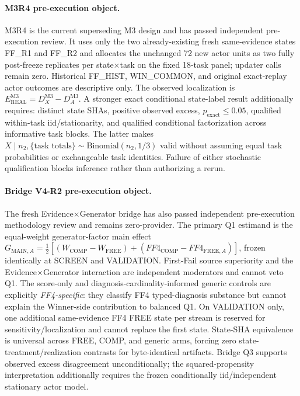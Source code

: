 \paragraph{M3R4 pre-execution object.}
M3R4 is the current superseding M3 design and has passed independent pre-execution review. It uses only the two already-existing fresh same-evidence states FF\_R1 and FF\_R2 and allocates the unchanged 72 new actor units as two fully post-freeze replicates per state$\times$task on the fixed 18-task panel; updater calls remain zero. Historical FF\_HIST, WIN\_COMMON, and original exact-replay actor outcomes are descriptive only. The observed localization is $E_{\mathrm{REAL}}^{\mathrm{M3}}=D_X^{\mathrm{M3}}-D_A^{\mathrm{M3}}$. A stronger exact conditional state-label result additionally requires: distinct state SHAs, positive observed excess, $p_{\mathrm{exact}}\leq0.05$, qualified within-task iid/stationarity, and qualified conditional factorization across informative task blocks. The latter makes $X\mid n_2,\{\text{task totals}\}\sim\mathrm{Binomial}(n_2,1/3)$ valid without assuming equal task probabilities or exchangeable task identities. Failure of either stochastic qualification blocks inference rather than authorizing a rerun.

\paragraph{Bridge V4-R2 pre-execution object.}
The fresh Evidence$\times$Generator bridge has also passed independent pre-execution methodology review and remains zero-provider. The primary Q1 estimand is the equal-weight generator-factor main effect $G_{\mathrm{MAIN},A}=\frac12[(W_{\mathrm{COMP}}-W_{\mathrm{FREE}})+(FF4_{\mathrm{COMP}}-FF4_{\mathrm{FREE},A})]$, frozen identically at SCREEN and VALIDATION. First-Fail source superiority and the Evidence$\times$Generator interaction are independent moderators and cannot veto Q1. The score-only and diagnosis-cardinality-informed generic controls are explicitly \emph{FF4-specific}: they classify FF4 typed-diagnosis substance but cannot explain the Winner-side contribution to balanced Q1. On VALIDATION only, one additional same-evidence FF4 FREE state per stream is reserved for sensitivity/localization and cannot replace the first state. State-SHA equivalence is universal across FREE, COMP, and generic arms, forcing zero state-treatment/realization contrasts for byte-identical artifacts. Bridge Q3 supports observed excess disagreement unconditionally; the squared-propensity interpretation additionally requires the frozen conditionally iid/independent stationary actor model.

